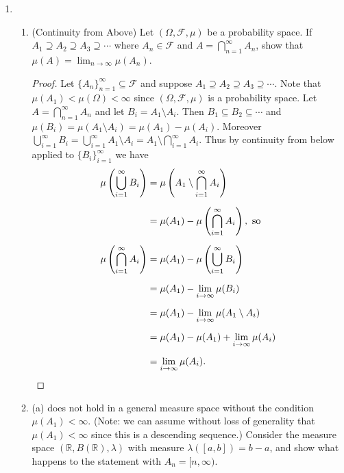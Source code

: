 \documentclass[11pt,oneside,english]{amsart}
\theoremstyle{definition}
\newcommand{\lspace}{\vspace{5mm}}
\newcommand{\MC}[1]{\mathcal{#1}}
\newcommand{\MB}[1]{\mathbb{#1}}
\newcommand{\1}{\mathbbm{1}}
\begin{document}
\rightline{\today}

\lspace




\begin{enumerate}[leftmargin=*]
\itemsep5mm



\item \begin{enumerate}\itemsep3mm

\item (Continuity from Above) Let $(\Omega,\MC{F},\mu)$ be a probability space. If $A_1\supseteq A_2\supseteq A_3\supseteq\cdots$ where $A_n\in\MC{F}$ and $A=\bigcap_{n=1}^\infty A_n$, show that $\mu(A)=\lim_{n\to\infty} \mu(A_n)$.

\begin{proof}
Let $\{A_n\}_{n=1}^\infty\subseteq\MC{F}$ and suppose $A_1\supseteq A_2\supseteq A_3\supseteq\cdots$. Note that $\mu(A_1)<\mu(\Omega)<\infty$ since $(\Omega,\MC{F},\mu)$ is a probability space. Let $A=\bigcap_{n=1}^\infty A_n$ and let $B_i=A_1\setminus A_i$. Then $B_1\subseteq B_2\subseteq \cdots$ and $\mu(B_i)=\mu(A_1\setminus A_i)=\mu(A_1)-\mu(A_i)$. Moreover $\bigcup_{i=1}^\infty B_i=\bigcup_{i=1}^\infty A_1\setminus A_i=A_1\setminus \bigcap_{i=1}^\infty A_i$. Thus by continuity from below applied to $\{B_i\}_{i=1}^\infty$  we have
\begin{align*}
\mu\left(\bigcup_{i=1}^\infty B_i\right)&=\mu\left(A_1\setminus \bigcap_{i=1}^\infty A_i\right)\\[2mm]
&=\mu(A_1)-\mu\left(\bigcap_{i=1}^\infty A_i\right),\text{ so}\\[2mm]
\mu\left(\bigcap_{i=1}^\infty A_i\right)&=\mu(A_1)-\mu\left(\bigcup_{i=1}^\infty B_i\right)\\[2mm]
&=\mu(A_1)-\lim_{i\to\infty}\mu(B_i)\\[2mm]
&=\mu(A_1)-\lim_{i\to\infty}\mu(A_1\setminus A_i)\\[2mm]
&=\mu(A_1)-\mu(A_1)+\lim_{i\to\infty}\mu(A_i)\\[2mm]
&=\lim_{i\to\infty}\mu(A_i).\qedhere
\end{align*}
\end{proof}


\item (a) does not hold in a general measure space without the condition $\mu(A_1)<\infty$. (Note: we can assume without loss of generality that $\mu(A_1)<\infty$ since this is a descending sequence.) Consider the measure space $(\MB{R},B(\MB{R}),\lambda)$ with measure $\lambda([a,b])=b-a$, and show what happens to the statement with $A_n=[n,\infty)$.


\end{enumerate}
\end{enumerate}
\end{document}
